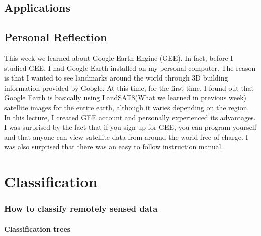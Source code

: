 \documentclass[
  letterpaper,
  DIV=11,
  numbers=noendperiod]{scrreprt}
\begin{document}
\hypertarget{applications-3}{%
\section{Applications}\label{applications-3}}

\hypertarget{personal-reflection-3}{%
\section{Personal Reflection}\label{personal-reflection-3}}

This week we learned about Google Earth Engine (GEE). In fact, before I
studied GEE, I had Google Earth installed on my personal computer. The
reason is that I wanted to see landmarks around the world through 3D
building information provided by Google. At this time, for the first
time, I found out that Google Earth is basically using LandSAT8(What we
learned in previous week) satellite images for the entire earth,
although it varies depending on the region. In this lecture, I created
GEE account and personally experienced its advantages. I was surprised
by the fact that if you sign up for GEE, you can program yourself and
that anyone can view satellite data from around the world free of
charge. I was also surprised that there was an easy to follow
instruction manual.


\hypertarget{classification}{%
\chapter{Classification}\label{classification}}

\hypertarget{how-to-classify-remotely-sensed-data}{%
\subsection{How to classify remotely sensed
data}\label{how-to-classify-remotely-sensed-data}}

\hypertarget{classification-trees}{%
\subsubsection{Classification trees}\label{classification-trees}}
\end{document}
